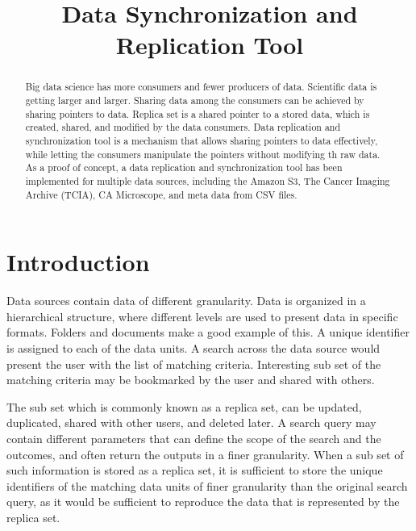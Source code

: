 \documentclass[conference]{IEEEtran}
\begin{document}
\title{Data Synchronization and Replication Tool}

\author{
\and
{}
}
\maketitle

\begin{abstract}
Big data science has more consumers and fewer producers of data. Scientific data is getting larger and larger. Sharing data among the consumers can be achieved by sharing pointers to data. Replica set is a shared pointer to a stored data, which is created, shared, and modified by the data consumers. Data replication and synchronization tool is a mechanism that allows sharing pointers to data effectively, while letting the consumers manipulate the pointers without modifying th raw data. As a proof of concept, a data replication and synchronization tool has been implemented for multiple data sources, including the Amazon S3, The Cancer Imaging Archive (TCIA), CA Microscope, and meta data from CSV files.
\end{abstract}

\IEEEpeerreviewmaketitle

\section{Introduction}
Data sources contain data of different granularity. Data is organized in a hierarchical structure, where different levels are used to present data in specific formats. Folders and documents make a good example of this. A unique identifier is assigned to each of the data units. A search across the data source would present the user with the list of matching criteria. Interesting sub set of the matching criteria may be bookmarked by the user and shared with others. 

The sub set which is commonly known as a replica set, can be updated, duplicated, shared with other users, and deleted later. A search query may contain different parameters that can define the scope of the search and the outcomes, and often return the outputs in a finer granularity. When a sub set of such information is stored as a replica set, it is sufficient to store the unique identifiers of the matching data units of finer granularity than the original search query, as it would be sufficient to reproduce the data that is represented by the replica set.
%
\end{document}
